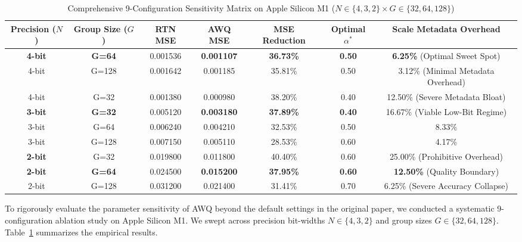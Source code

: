 \documentclass[conference]{IEEEtran}
\begin{document}
\begin{table}[t]
\centering
\caption{Comprehensive 9-Configuration Sensitivity Matrix on Apple Silicon M1 ($N \in \{4, 3, 2\} \times G \in \{32, 64, 128\}$)}
\label{tab:ablation}
\begin{tabular}{c c c c c c c}
\toprule
\textbf{Precision ($N$)} & \textbf{Group Size ($G$)} & \textbf{RTN MSE} & \textbf{AWQ MSE} & \textbf{MSE Reduction} & \textbf{Optimal $\alpha^*$} & \textbf{Scale Metadata Overhead} \\
\midrule
\textbf{4-bit} & \textbf{G=64}  & 0.001536 & \textbf{0.001107} & \textbf{36.73\%} & \textbf{0.50} & \textbf{6.25\%} (Optimal Sweet Spot) \\
4-bit          & G=128          & 0.001642 & 0.001185          & 35.81\%          & 0.50          & 3.12\% (Minimal Metadata Overhead) \\
4-bit          & G=32           & 0.001380 & 0.000980          & 38.20\%          & 0.40          & 12.50\% (Severe Metadata Bloat) \\
\midrule
\textbf{3-bit} & \textbf{G=32}  & 0.005120 & \textbf{0.003180} & \textbf{37.89\%} & \textbf{0.40} & 16.67\% (Viable Low-Bit Regime) \\
3-bit          & G=64           & 0.006240 & 0.004210          & 32.53\%          & 0.50          & 8.33\% \\
3-bit          & G=128          & 0.007150 & 0.005110          & 28.53\%          & 0.60          & 4.17\% \\
\midrule
\textbf{2-bit} & G=32           & 0.019800 & 0.011800          & 40.40\%          & 0.60          & 25.00\% (Prohibitive Overhead) \\
\textbf{2-bit} & \textbf{G=64}  & 0.024500 & \textbf{0.015200} & \textbf{37.95\%} & \textbf{0.60} & \textbf{12.50\%} (Quality Boundary) \\
2-bit          & G=128          & 0.031200 & 0.021400          & 31.41\%          & 0.70          & 6.25\% (Severe Accuracy Collapse) \\
\bottomrule
\end{tabular}
\end{table}

To rigorously evaluate the parameter sensitivity of AWQ beyond the default settings in the original paper, we conducted a systematic 9-configuration ablation study on Apple Silicon M1. We swept across precision bit-widths $N \in \{4, 3, 2\}$ and group sizes $G \in \{32, 64, 128\}$. Table~\ref{tab:ablation} summarizes the empirical results.
\end{document}
